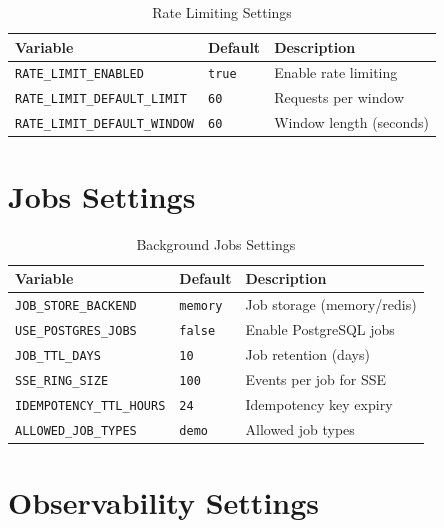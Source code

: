\documentclass[a4paper,twoside]{sapthesis}
\begin{document}
\begin{table}[ht]
\centering
\caption{Rate Limiting Settings}
\label{tab:config-ratelimit}
\small
\begin{tabularx}{\textwidth}{llX}
    \hline
    \textbf{Variable} & \textbf{Default} & \textbf{Description} \\
    \hline
    \texttt{RATE\_LIMIT\_ENABLED} & \texttt{true} & Enable rate limiting \\
    \texttt{RATE\_LIMIT\_DEFAULT\_LIMIT} & \texttt{60} & Requests per window \\
    \texttt{RATE\_LIMIT\_DEFAULT\_WINDOW} & \texttt{60} & Window length (seconds) \\
    \hline
\end{tabularx}
\end{table}

\section{Jobs Settings}
\label{app:config:jobs}

\begin{table}[ht]
\centering
\caption{Background Jobs Settings}
\label{tab:config-jobs}
\small
\begin{tabularx}{\textwidth}{llX}
    \hline
    \textbf{Variable} & \textbf{Default} & \textbf{Description} \\
    \hline
    \texttt{JOB\_STORE\_BACKEND} & \texttt{memory} & Job storage (memory/redis) \\
    \texttt{USE\_POSTGRES\_JOBS} & \texttt{false} & Enable PostgreSQL jobs \\
    \texttt{JOB\_TTL\_DAYS} & \texttt{10} & Job retention (days) \\
    \texttt{SSE\_RING\_SIZE} & \texttt{100} & Events per job for SSE \\
    \texttt{IDEMPOTENCY\_TTL\_HOURS} & \texttt{24} & Idempotency key expiry \\
    \texttt{ALLOWED\_JOB\_TYPES} & \texttt{demo} & Allowed job types \\
    \hline
\end{tabularx}
\end{table}

\section{Observability Settings}
\label{app:config:observability}
\end{document}
